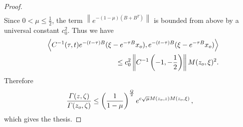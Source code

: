 \documentclass[10pt,a4paper]{amsart}
\renewcommand{\Gamma}{\varGamma}
\begin{document}
\begin{proof}
\begin{eqnarray*}
\end{eqnarray*}
Since $0<\mu\leq\frac{1}{2}$, the term $\left\|e^{-(1-\mu)(B+B^T)}\right\|$ is bounded from above by a universal constant $c_0^2$. Thus we have
\begin{eqnarray*}
&& \left\langle C^{-1}(\tau,t)e^{-(t-\tau)B}(\xi -e^{-\tau B}x_{\rm o}),e^{-(t-\tau)B}(\xi -e^{-\tau B}x_{\rm o})\right\rangle\notag\\
&& \qquad\quad \leq c_0^2 \left\|C^{-1}\left(-1,-\frac{1}{2}\right)\right\|M(z_{\rm o},\xi)^2.
\end{eqnarray*}
Therefore
\[
\frac{\Gamma(z,\zeta)}{\Gamma(z_{\rm o},\zeta)}\leq\left(\frac{1}{1-\mu}\right)^{\frac{Q}{2}}e^{c\sqrt{\mu} M(z_{\rm o},z) M(z_{\rm o},\xi)}\,,
\]
which gives the thesis.
\end{proof}
\end{document}
